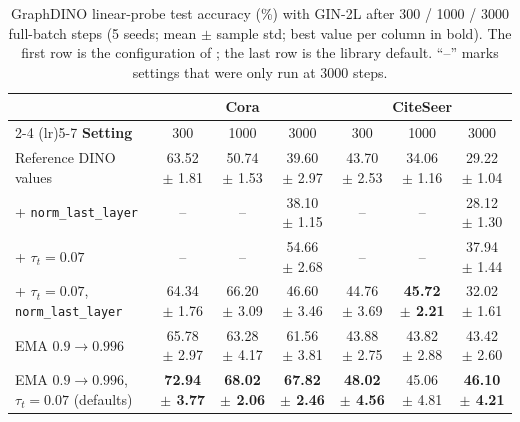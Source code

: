 \documentclass[conference]{IEEEtran}
\begin{document}
\begin{table}[htbp]
\centering
\small
\caption{GraphDINO linear-probe test accuracy (\%) with GIN-2L after 300 / 1000 / 3000 full-batch steps (5 seeds; mean $\pm$ sample std; best value per column in bold). The first row is the configuration of ; the last row is the library default. ``--'' marks settings that were only run at 3000 steps.}
\label{tab:graphdino-stability}
\begin{tabular}{@{}lcccccc@{}}
\toprule
& \multicolumn{3}{c}{\textbf{Cora}} & \multicolumn{3}{c}{\textbf{CiteSeer}} \\
\cmidrule(lr){2-4} \cmidrule(lr){5-7}
\textbf{Setting} & 300 & 1000 & 3000 & 300 & 1000 & 3000 \\ \midrule
Reference DINO values & 63.52 $\pm$ 1.81 & 50.74 $\pm$ 1.53 & 39.60 $\pm$ 2.97 & 43.70 $\pm$ 2.53 & 34.06 $\pm$ 1.16 & 29.22 $\pm$ 1.04 \\
\quad + \texttt{norm\_last\_layer} & -- & -- & 38.10 $\pm$ 1.15 & -- & -- & 28.12 $\pm$ 1.30 \\
\quad + $\tau_t{=}0.07$ & -- & -- & 54.66 $\pm$ 2.68 & -- & -- & 37.94 $\pm$ 1.44 \\
\quad + $\tau_t{=}0.07$, \texttt{norm\_last\_layer} & 64.34 $\pm$ 1.76 & 66.20 $\pm$ 3.09 & 46.60 $\pm$ 3.46 & 44.76 $\pm$ 3.69 & \textbf{45.72 $\pm$ 2.21} & 32.02 $\pm$ 1.61 \\
EMA $0.9 \rightarrow 0.996$ & 65.78 $\pm$ 2.97 & 63.28 $\pm$ 4.17 & 61.56 $\pm$ 3.81 & 43.88 $\pm$ 2.75 & 43.82 $\pm$ 2.88 & 43.42 $\pm$ 2.60 \\
EMA $0.9 \rightarrow 0.996$, $\tau_t{=}0.07$ (defaults) & \textbf{72.94 $\pm$ 3.77} & \textbf{68.02 $\pm$ 2.06} & \textbf{67.82 $\pm$ 2.46} & \textbf{48.02 $\pm$ 4.56} & 45.06 $\pm$ 4.81 & \textbf{46.10 $\pm$ 4.21} \\ \bottomrule
\end{tabular}
\end{table}
\end{document}

